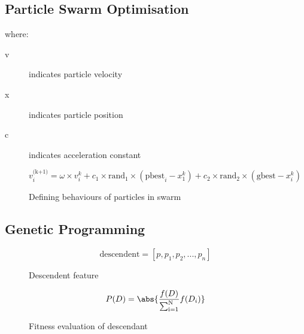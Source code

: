 \subsection{Particle Swarm Optimisation}
where:
\begin{description}
\item[v] indicates particle velocity
\item[x] indicates particle position
\item[c] indicates acceleration constant
\end{description}

\begin{figure}[h]
\begin{equation}
    v_i^\textrm{(k+1)} = \omega \times v_i^k + c_1 \times \textrm{rand}_1 \times (\textrm{pbest}_i -x_1^k) + c_2 \times \textrm{rand}_2 \times (\textrm{gbest} - x_i^k)
\end{equation}
\caption{Defining behaviours of particles in swarm}
\end{figure}

\subsection{Genetic Programming}

\begin{figure}[h]
\begin{equation}
    \textrm{descendent} = [p, p_1, p_2, ..., p_n]
\end{equation}
\caption{Descendent feature}
\end{figure}

\begin{figure}[h]
\begin{equation}
    P(D) = \abs{ \frac{f(D)}{\sum_\textrm{i=1}^\textrm{N}}f(D_i) }
\end{equation}
\caption{Fitness evaluation of descendant}
\end{figure}
